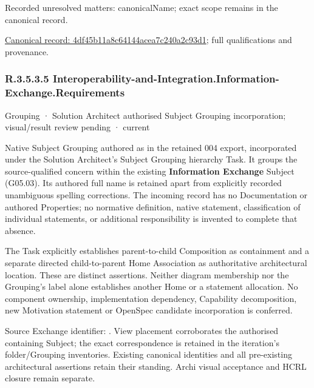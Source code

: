 {\small Recorded unresolved matters: canonicalName; exact scope remains in the canonical record.}\par
{\footnotesize \href{../../../../continuum/grouping/4df45b11a8c64144acea7c240a2c93d1.md}{Canonical record: 4df45b11a8c64144acea7c240a2c93d1}; full qualifications and provenance.}\par
\subsubsection*{R.3.5.3.5 Interoperability-and-Integration.Information-Exchange.Requirements}
\label{navigation:R.3.5.3.5}

\label{element:1de844b879754fd7a21a29f2df3df97b}
{\small Grouping · Solution Architect authorised Subject Grouping incorporation; visual/result review pending · current}\par

Native Subject Grouping authored as \texttt{} in the retained 004 export,
incorporated under the Solution Architect's Subject Grouping hierarchy Task.
It groups the source-qualified \texttt{} concern within
the existing \textbf{Information Exchange} Subject (G05.03). Its authored full name
is retained apart from explicitly recorded unambiguous spelling corrections.
The incoming record has no Documentation or authored Properties; no normative
definition, native statement, classification of individual statements, or
additional responsibility is invented to complete that absence.



The Task explicitly establishes parent-to-child Composition as containment and
a separate directed child-to-parent Home Association as authoritative architectural
location. These are distinct assertions. Neither diagram membership nor the
Grouping's label alone establishes another Home or a statement allocation.
No component ownership, implementation dependency, Capability decomposition,
new Motivation statement or OpenSpec candidate incorporation is conferred.



Source Exchange identifier: \texttt{}. View placement corroborates
the authorised containing Subject; the exact correspondence is retained in the
iteration's folder/Grouping inventories. Existing canonical identities and all
pre-existing architectural assertions retain their standing. Archi visual
acceptance and HCRL closure remain separate.


